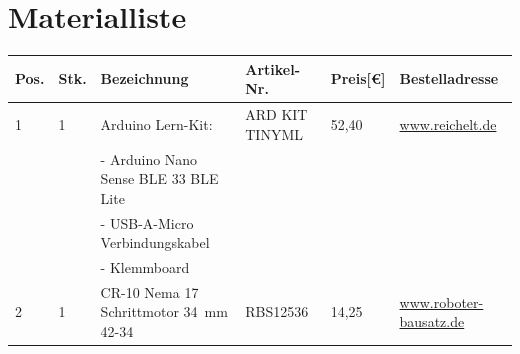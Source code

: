 \chapter{Materialliste} \label{MLL}
\begin{center}
	\fontsize{8}{10}\selectfont
	\begin{tabularx}{\textwidth}{|p{0.4cm}|p{0.4cm}|X|X|p{1cm}|X|}
		\hline 
		\textbf{Pos.} & \textbf{Stk.} & \textbf{Bezeichnung} & \textbf{Artikel-Nr.} & \textbf{Preis[€]} & \textbf{Bestelladresse} \\ \hline
		1 & 1 & Arduino Lern-Kit: & ARD KIT TINYML & 52,40 & \href{https://www.reichelt.de}{www.reichelt.de} \\
		&   & - Arduino Nano Sense BLE 33 BLE Lite & & & \\ 
		&   &- USB-A-Micro Verbindungskabel & & & \\
		&   &- Klemmboard & & & \\
		\hline
		2 & 1 & CR-10 Nema 17 Schrittmotor 34\ mm 42-34 & RBS12536 & 14,25 & \href{https://www.roboter-bausatz.de/p/cr-10-nema-17-schrittmotor-34mm-42-34}{www.roboter-bausatz.de} \\
		\hline
		

\end{tabularx}
\end{center}

